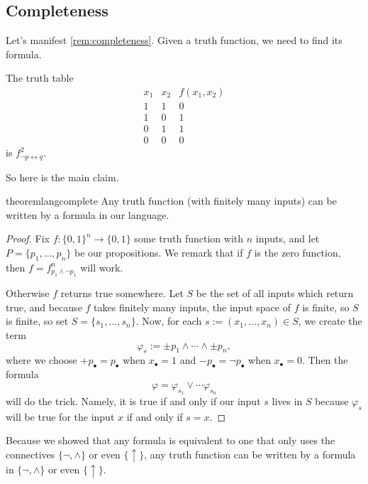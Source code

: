 \subsection{Completeness}
Let's manifest \autoref{rem:completeness}. Given a truth function, we need to find its formula.
\begin{example}
	The truth table
	\[\begin{array}{c|c||c}
		x_1 & x_2 & f(x_1,x_2) \\
		\hline
		1 & 1 & 0 \\
		1 & 0 & 1 \\
		0 & 1 & 1 \\
		0 & 0 & 0
	\end{array}\]
	is $f_{\lnot p\leftrightarrow q}^2$.
\end{example}
So here is the main claim.
\begin{restatable}{theorem}{langcomplete} \label{thm:langcomplete}
	Any truth function (with finitely many inputs) can be written by a formula in our language.
\end{restatable}
\begin{proof}
	Fix $f:\{0,1\}^n\to\{0,1\}$ some truth function with $n$ inputs, and let $P=\{p_1,\ldots,p_n\}$ be our propositions. We remark that if $f$ is the zero function, then $f=f_{p_1\land\lnot p_1}^n$ will work.

	Otherwise $f$ returns true somewhere. Let $S$ be the set of all inputs which return true, and because $f$ takes finitely many inputs, the input space of $f$ is finite, so $S$ is finite, so set $S=\{s_1,\ldots,s_n\}$. Now, for each $s:=(x_1,\ldots,x_n)\in S$, we create the term
	\[\varphi_s:=\pm p_1\land\cdots\land\pm p_n,\]
	where we choose $+p_\bullet=p_\bullet$ when $x_\bullet=1$ and $-p_\bullet=\lnot p_\bullet$ when $x_\bullet=0$. Then the formula
	\[\varphi=\varphi_{s_1}\lor\cdots\varphi_{s_n}\]
	will do the trick. Namely, it is true if and only if our input $s$ lives in $S$ because $\varphi_s$ will be true for the input $x$ if and only if $s=x$.
\end{proof}
\begin{remark}
	Because we showed that any formula is equivalent to one that only uses the connectives $\{\lnot,\land\}$ or even $\{\uparrow\}$, any truth function can be written by a formula in $\{\lnot,\land\}$ or even $\{\uparrow\}$.
\end{remark}